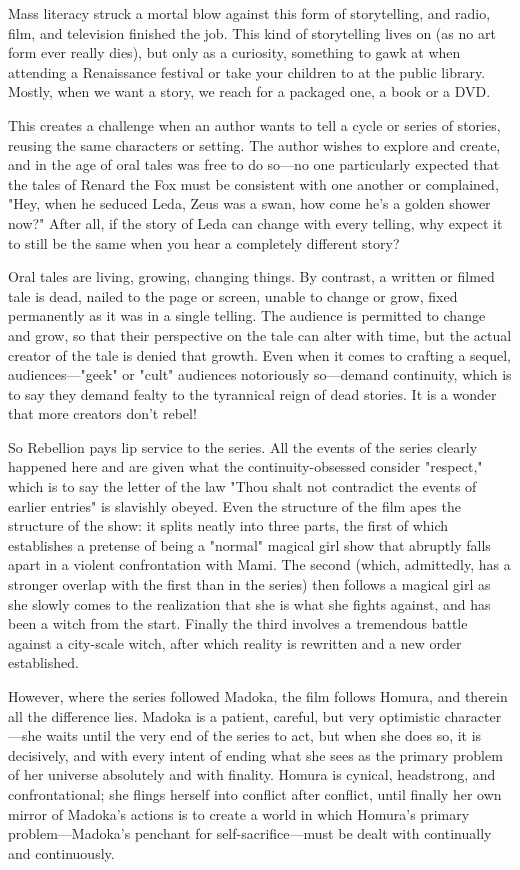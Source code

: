 Mass literacy struck a mortal blow against this form of storytelling, and radio, film, and television finished the job. This kind of storytelling lives on (as no art form ever really dies), but only as a curiosity, something to gawk at when attending a Renaissance festival or take your children to at the public library. Mostly, when we want a story, we reach for a packaged one, a book or a DVD.

This creates a challenge when an author wants to tell a cycle or series of stories, reusing the same characters or setting. The author wishes to explore and create, and in the age of oral tales was free to do so—no one particularly expected that the tales of Renard the Fox must be consistent with one another or complained, "Hey, when he seduced Leda, Zeus was a swan, how come he's a golden shower now?" After all, if the story of Leda can change with every telling, why expect it to still be the same when you hear a completely different story? 

Oral tales are living, growing, changing things. By contrast, a written or filmed tale is dead, nailed to the page or screen, unable to change or grow, fixed permanently as it was in a single telling. The audience is permitted to change and grow, so that their perspective on the tale can alter with time, but the actual creator of the tale is denied that growth. Even when it comes to crafting a sequel, audiences—"geek" or "cult" audiences notoriously so—demand continuity, which is to say they demand fealty to the tyrannical reign of dead stories. It is a wonder that more creators don't rebel! 

So Rebellion pays lip service to the series. All the events of the series clearly happened here and are given what the continuity-obsessed consider "respect," which is to say the letter of the law "Thou shalt not contradict the events of earlier entries" is slavishly obeyed. Even the structure of the film apes the structure of the show: it splits neatly into three parts, the first of which establishes a pretense of being a "normal" magical girl show that abruptly falls apart in a violent confrontation with Mami. The second (which, admittedly, has a stronger overlap with the first than in the series) then follows a magical girl as she slowly comes to the realization that she is what she fights against, and has been a witch from the start. Finally the third involves a tremendous battle against a city-scale witch, after which reality is rewritten and a new order established.

However, where the series followed Madoka, the film follows Homura, and therein all the difference lies. Madoka is a patient, careful, but very optimistic character—she waits until the very end of the series to act, but when she does so, it is decisively, and with every intent of ending what she sees as the primary problem of her universe absolutely and with finality. Homura is cynical, headstrong, and confrontational; she flings herself into conflict after conflict, until finally her own mirror of Madoka's actions is to create a world in which Homura's primary problem—Madoka's penchant for self-sacrifice—must be dealt with continually and continuously.

